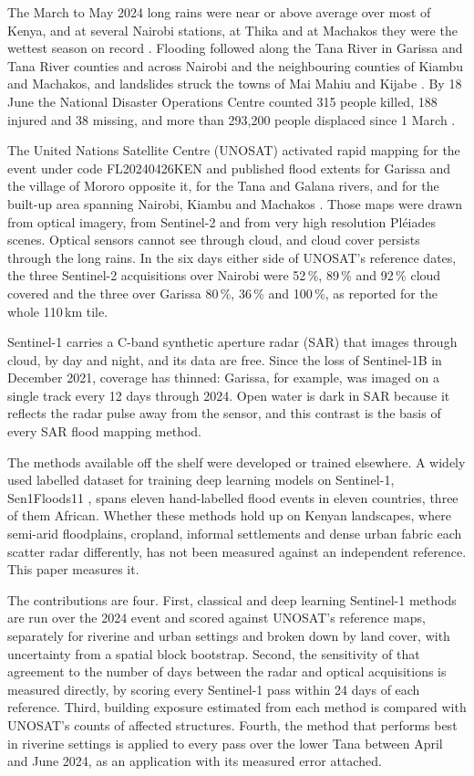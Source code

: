 \documentclass[11pt]{article}
\begin{document}
The March to May 2024 long rains were near or above average over most of
Kenya, and at several Nairobi stations, at Thika and at Machakos they were the
wettest season on record \cite{kmd2024}. Flooding followed along the Tana River
in Garissa and Tana River counties and across Nairobi and the neighbouring
counties of Kiambu and Machakos, and landslides struck the towns of Mai Mahiu
and Kijabe \cite{unosat2024}. By 18 June the National Disaster Operations Centre counted
315 people killed, 188 injured and 38 missing, and more than 293,200 people
displaced since 1 March \cite{ocha2024fu7}.

The United Nations Satellite Centre (UNOSAT) activated rapid mapping for the
event under code FL20240426KEN and published flood extents for Garissa and
the village of Mororo opposite it, for the Tana and Galana rivers, and for the
built-up area spanning Nairobi, Kiambu and Machakos \cite{unosat2024}. Those
maps were drawn from optical imagery, from Sentinel-2 and from very high
resolution Pléiades scenes. Optical sensors cannot see through cloud, and
cloud cover persists through the long rains. In the six days
either side of UNOSAT's reference dates, the three Sentinel-2 acquisitions over
Nairobi were 52\,\%, 89\,\% and 92\,\% cloud covered and the three over
Garissa 80\,\%, 36\,\% and 100\,\%, as reported for the whole 110\,km tile.

Sentinel-1 carries a C-band synthetic aperture radar (SAR) that images through
cloud, by day and night, and its data are free. Since the loss of Sentinel-1B in
December 2021, coverage has thinned: Garissa, for example, was imaged on a
single track every 12 days through 2024. Open water is dark in SAR because it
reflects the radar pulse away from the sensor, and this contrast is the basis
of every SAR flood mapping method.

The methods available off the shelf were developed or trained elsewhere. A
widely used labelled dataset for training deep learning models on Sentinel-1,
Sen1Floods11 \cite{bonafilia2020}, spans eleven hand-labelled flood events in
eleven countries, three of them African. Whether these methods hold up on
Kenyan landscapes, where semi-arid floodplains, cropland, informal
settlements and dense urban fabric each scatter radar differently, has not
been measured against an independent reference. This paper measures it.

The contributions are four. First, classical and deep learning Sentinel-1
methods are run over the 2024 event and scored against UNOSAT's reference
maps, separately for riverine and urban settings and broken down by land
cover, with uncertainty from a spatial block bootstrap. Second, the
sensitivity of that agreement to the number of days between the radar and
optical acquisitions is measured directly, by scoring every Sentinel-1 pass
within 24 days of each reference. Third, building exposure estimated from each
method is compared with UNOSAT's counts of affected structures. Fourth, the
method that performs best in riverine settings is applied to every pass over
the lower Tana between April and June 2024, as an application with its
measured error attached.
\end{document}
